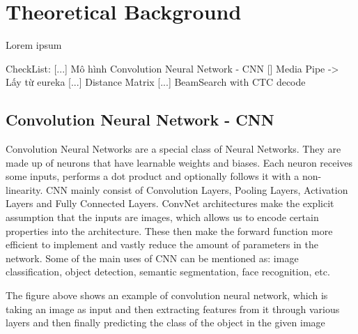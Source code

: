\chapter{Theoretical Background}

Lorem ipsum

CheckList:
    [...] Mô hình Convolution Neural Network - CNN
    [] Media Pipe -> Lấy từ eureka
    [...] Distance Matrix
    [...] BeamSearch with CTC decode

  \section{ Convolution Neural Network - CNN }
    Convolution Neural Networks are a special class of Neural Networks. They are made up 
    of neurons that have learnable weights and biases. Each neuron receives some inputs, 
    performs a dot product and optionally follows it with a non-linearity. CNN mainly consist
    of Convolution Layers, Pooling Layers, Activation Layers and Fully Connected Layers.
    ConvNet architectures make the explicit assumption that the inputs are images, 
    which allows us to encode certain properties into the architecture. These then 
    make the forward function more efficient to implement and vastly reduce the amount 
    of parameters in the network. Some of the main uses of CNN can be mentioned as: image
    classification, object detection, semantic segmentation, face recognition, etc.
    
    
      The figure above shows an example of convolution neural network, which is taking an image 
    as input and then extracting features from it through various layers and then finally predicting the
    class of the object in the given image


